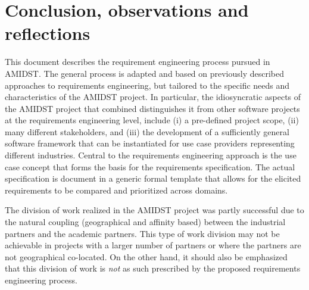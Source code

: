 \section{Conclusion, observations and reflections} 
\label{sec:conclusion}

This document describes the requirement engineering process pursued in AMIDST. The general process is  adapted and based
on previously described approaches to requirements engineering, but tailored to the specific needs and characteristics of the AMIDST
project. In particular, the idiosyncratic aspects of the AMIDST project that combined distinguishes it from other software
projects at the requirements engineering level, include (i) a pre-defined project scope, (ii) many different
stakeholders, and (iii) the development of a sufficiently general software framework that can be instantiated for
use case providers representing different industries.  Central to the requirements engineering approach is the use case
concept that forms the basis for the requirements specification. The actual specification is document in a generic
formal template that allows for the elicited requirements to be compared and prioritized across domains. 

The division of work realized in the AMIDST project was partly successful due to the natural coupling (geographical and
affinity based) between the industrial partners and the academic partners. This type of work division may not be
achievable in projects with a larger number of partners or where the partners are not geographical co-located. On the
other hand, it should also be emphasized that this division of work is \emph{not} as such prescribed by the proposed requirements engineering process.
